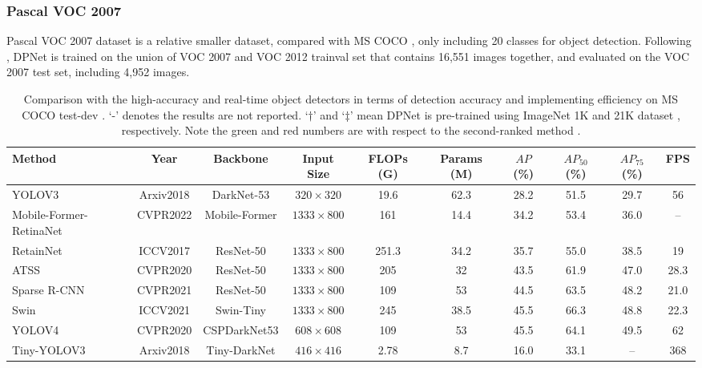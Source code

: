 \documentclass[lettersize,journal]{IEEEtran}
\begin{document}
\subsubsection{Pascal VOC 2007}
Pascal VOC 2007 dataset \cite{everingham2010pascal} is a relative smaller dataset, compared with MS COCO \cite{lin2014microsoft}, only including 20 classes for object detection. Following \cite{Pelee,li2018tiny}, DPNet is trained on the union of VOC 2007 and VOC 2012 trainval set that contains 16,551 images together, and evaluated on the VOC 2007 test set, including 4,952 images. 

\begin{table*}[t!]
\tabcolsep 0.9mm \caption{Comparison with the high-accuracy and real-time object detectors in terms of detection accuracy and implementing efficiency on MS COCO test-dev \cite{lin2014microsoft}. ‘-’ denotes the results are not reported. ‘$\dagger$’ and ‘$\ddagger$’ mean DPNet is pre-trained using ImageNet 1K and 21K dataset \cite{deng2009imagenet}, respectively. Note the green and red numbers are with respect to the second-ranked method \cite{qin2019thundernet}.} 
	\begin{center}
	\begin{tabular}{l|c|c|c|c|c|c|c|c|c}
			\toprule Method&Year&Backbone&Input Size&FLOPs (G) & Params (M) & $AP$ (\%) &$AP_{50}$ (\%) &$AP_{75}$ (\%) & FPS\\
\midrule		
			YOLOV3 \cite{redmon2018yolov3}&Arxiv2018&DarkNet-53 & $320\times320$ &19.6 &62.3 &28.2 &51.5&29.7&56\\
			Mobile-Former-RetinaNet\cite{chen2021mobile} &CVPR2022 &Mobile-Former &$1333\times800$  &161 &14.4 &34.2&53.4&36.0&--\\
			RetainNet \cite{lin2017focal} &ICCV2017&ResNet-50& $1333\times800$ &251.3 &34.2 &35.7&55.0&38.5&19\\
			ATSS\cite{zhang2020bridging}  &CVPR2020&ResNet-50 & $1333\times800$&205 & 32 &43.5 &61.9&47.0 &28.3\\		
			Sparse R-CNN\cite{sun2021sparse}  &CVPR2021&ResNet-50 & $1333\times800$&109 & 53 &44.5 &63.5&48.2 &21.0\\
			Swin \cite{liu2021Swin}&ICCV2021 &Swin-Tiny &$1333\times800$ &245 &38.5 &45.5 &66.3&48.8&22.3\\
			YOLOV4 \cite{wang2021scaled} &CVPR2020&CSPDarkNet53 & $608\times608$&109 & 53 &45.5 &64.1&49.5 &62\\
\midrule
			Tiny-YOLOV3 \cite{redmon2018yolov3} &Arxiv2018&Tiny-DarkNet & $416\times416$&2.78 & 8.7 &16.0&33.1&-- &368\\

\end{tabular}
\end{center}
\end{table*}
\end{document}
